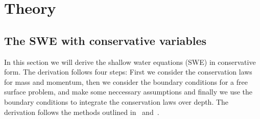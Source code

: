 \chapter{Theory}



\section{The SWE with conservative variables}
In this section we will derive the shallow water equations (SWE) in conservative form.
The derivation follows four steps: First we consider the conservation laws for mass and momentum, then we consider the boundary conditions for a free surface problem, and make some neccessary assumptions and finally we use the boundary conditions to integrate the conservation laws over depth.
The derivation follows the methods outlined in~\cite{Toro2001-Shock} and~\cite{Vreugdenhil1994}.

